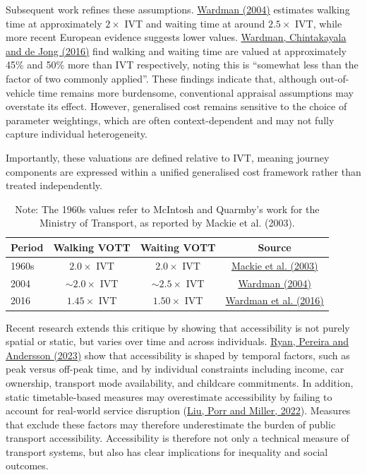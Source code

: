 \documentclass[11pt,a4paper]{article}
\newcommand{\hcite}[2]{\hyperlink{#1}{#2}}
\newcommand{\hcite}[2]{\hyperlink{#1}{#2}}
\begin{document}
Subsequent work refines these assumptions. \hcite{wardman2004}{Wardman (2004)} estimates walking time at approximately $2\times$ IVT and waiting time at around $2.5\times$ IVT, while more recent European evidence suggests lower values. \hcite{wardman2016}{Wardman, Chintakayala and de Jong (2016)} find walking and waiting time are valued at approximately 45\% and 50\% more than IVT respectively, noting this is ``somewhat less than the factor of two commonly applied''. These findings indicate that, although out-of-vehicle time remains more burdensome, conventional appraisal assumptions may overstate its effect. However, generalised cost remains sensitive to the choice of parameter weightings, which are often context-dependent and may not fully capture individual heterogeneity.

Importantly, these valuations are defined relative to IVT, meaning journey components are expressed within a unified generalised cost framework rather than treated independently.

\begin{table}[H]
\centering
\caption{Evolution of walking and waiting time valuations}
\label{tab:vott}
\begin{tabular}{lccc}
\toprule
\textbf{Period} & \textbf{Walking VOTT} & \textbf{Waiting VOTT} & \textbf{Source} \\
\midrule
1960s & $2.0\times$ IVT & $2.0\times$ IVT & \hcite{mackie2003}{Mackie et al. (2003)} \\
2004  & $\sim 2.0\times$ IVT & $\sim 2.5\times$ IVT & \hcite{wardman2004}{Wardman (2004)} \\
2016  & $1.45\times$ IVT & $1.50\times$ IVT & \hcite{wardman2016}{Wardman et al. (2016)} \\
\bottomrule
\end{tabular}
\caption*{\footnotesize Note: The 1960s values refer to McIntosh and Quarmby's work for the Ministry of Transport, as reported by Mackie et al. (2003).}
\end{table}
Recent research extends this critique by showing that accessibility is not purely spatial or static, but varies over time and across individuals. \hcite{ryan2023}{Ryan, Pereira and Andersson (2023)} show that accessibility is shaped by temporal factors, such as peak versus off-peak time, and by individual constraints including income, car ownership, transport mode availability, and childcare commitments. In addition, static timetable-based measures may overestimate accessibility by failing to account for real-world service disruption (\hcite{liu2022}{Liu, Porr and Miller, 2022}). Measures that exclude these factors may therefore underestimate the burden of public transport accessibility. Accessibility is therefore not only a technical measure of transport systems, but also has clear implications for inequality and social outcomes.
\end{document}
